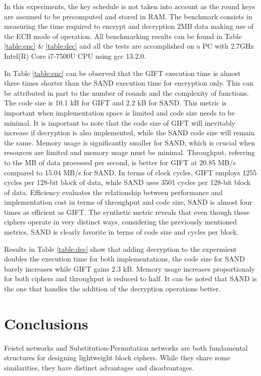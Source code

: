 \documentclass[conference]{IEEEtran}
\begin{document}
In this experiments, the key schedule is not taken into account as the round keys are assumed to be precomputed and stored in RAM. The benchmark consists in measuring the time required to encrypt and decryption 2MB data making use of the ECB mode of operation. All benchmarking results can be found in Table \ref{table:enc} \& \ref{table:dec} and all the tests are accomplished on a PC with 2.7GHz Intel(R) Core i7-7500U CPU using gcc 13.2.0.  

In Table \ref{table:enc} can be observed that the GIFT execution time is almost three times shorter than the SAND execution time for encryption only. This can be attributed in part to the number of rounds and the complexity of functions. The code size is 10.1 kB for GIFT and 2.2 kB for SAND. This metric is important when implementation space is limited and code size needs to be minimal. It is important to note that the code size of GIFT will inevitably increase if decryption is also implemented, while the SAND code size will remain the same. Memory usage is significantly smaller for SAND, which is crucial when resources are limited and memory usage must be minimal. Throughput, referring to the MB of data processed per second, is better for GIFT at 20.85 MB/s compared to 15.04 MB/s for SAND. In terms of clock cycles, GIFT employs 1255 cycles per 128-bit block of data, while SAND uses 3501 cycles per 128-bit block of data. Efficiency evaluates the relationship between performance and implementation cost in terms of throughput and code size, SAND is almost four times as efficient as GIFT. The synthetic metric reveals that even though these ciphers operate in very distinct ways, considering the previously mentioned metrics, SAND is clearly favorite in terms of code size and cycles per block.

Results in Table \ref{table:dec} show that adding decryption to the expermient doubles the execution time for both implementations, the code size for SAND barely increases while GIFT gains 2.3 kB. Memory usage increases proportionaly for both ciphers and throughput is reduced to half. It can be noted that SAND is the one that handles the addition of the decryption operations better.

\section{Conclusions}\label{sec:conc}
Feistel networks and Substitution-Permutation networks are both fundamental structures for designing lightweight block ciphers. While they share some similarities, they have distinct advantages and disadvantages.
\end{document}
